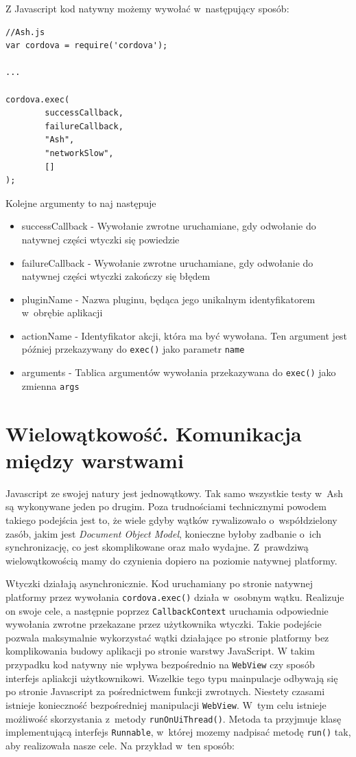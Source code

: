 \documentclass[brudnopis]{xmgr}
\begin{document}
Z Javascript kod natywny możemy wywołać w~następujący sposób:

\begin{lstlisting}
//Ash.js
var cordova = require('cordova');

...

cordova.exec( 
        successCallback,
        failureCallback, 
        "Ash", 
        "networkSlow", 
        []
);
\end{lstlisting}

Kolejne argumenty to naj następuje
\begin{itemize}
  \item successCallback - Wywołanie zwrotne uruchamiane, gdy odwołanie do natywnej części wtyczki się powiedzie
  \item failureCallback - Wywołanie zwrotne uruchamiane, gdy odwołanie do natywnej części wtyczki zakończy się błędem
  \item pluginName - Nazwa pluginu, będąca jego unikalnym identyfikatorem w~obrębie aplikacji
  \item actionName - Identyfikator akcji, która ma być wywołana. Ten argument jest później przekazywany do \texttt{exec()} jako parametr \texttt{name} 
\item arguments - Tablica argumentów wywołania przekazywana do \texttt{exec()} jako zmienna \texttt{args} 
\end{itemize}

\section{Wielowątkowość. Komunikacja między warstwami}

Javascript ze swojej natury jest jednowątkowy. Tak samo wszystkie testy w~Ash są wykonywane jeden po drugim. Poza trudnościami technicznymi powodem takiego podejścia jest to, że wiele gdyby wątków rywalizowało o~współdzielony zasób, jakim jest \textit{Document Object Model}, konieczne byłoby zadbanie o~ich synchronizację, co jest skomplikowane oraz mało wydajne. Z~prawdziwą wielowątkowością mamy do czynienia dopiero na poziomie natywnej platformy.

Wtyczki działają asynchronicznie. Kod uruchamiany po stronie natywnej platformy przez wywołania \texttt{cordova.exec()} działa w~osobnym wątku. Realizuje on swoje cele, a następnie poprzez \texttt{CallbackContext} uruchamia odpowiednie wywołania zwrotne przekazane przez użytkownika wtyczki. Takie podejście pozwala maksymalnie wykorzystać wątki działające po stronie platformy bez komplikowania budowy aplikacji po stronie warstwy JavaScript. W takim przypadku kod natywny nie wpływa bezpośrednio na \texttt{WebView} czy sposób interfejs apliakcji użytkownikowi. Wszelkie tego typu mainpulacje odbywają się po stronie Javascript za pośrednictwem funkcji zwrotnych. Niestety czasami istnieje konieczność bezpośredniej manipulacji \texttt{WebView}. W~tym celu istnieje możliwość skorzystania z~metody \texttt{runOnUiThread()}. Metoda ta przyjmuje klasę implementującą interfejs \texttt{Runnable}, w~której mozemy nadpisać metodę \texttt{run()} tak, aby realizowała nasze cele. Na przykład w~ten sposób:
\end{document}

